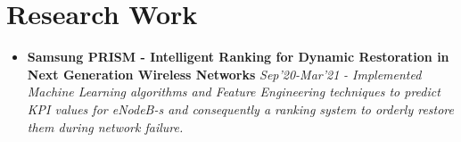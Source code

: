 \documentclass{article}
\begin{document}


\section*{Research Work}
\begin{itemize}
    \item{\textbf{\large{Samsung PRISM - Intelligent Ranking for Dynamic Restoration in Next Generation Wireless Networks}}} \hfill \textit{Sep'20-Mar'21}
          \newline
          \textit{- Implemented Machine Learning algorithms and Feature Engineering techniques to predict KPI values for eNodeB-s and consequently a ranking system
              to orderly restore them during network failure.}
\end{itemize}
\end{document}
